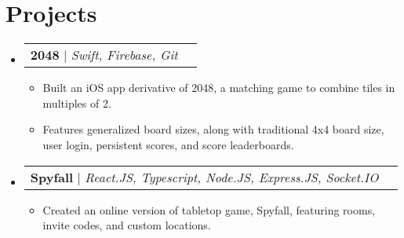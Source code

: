 \documentclass[letterpaper,11pt]{article}
\makeatletter
\newcommand{\resumeItem}[1]{
  \item\small{
    {#1 \vspace{-2pt}}
  }
}
\newcommand{\resumeProjectHeading}[2]{
    \item
    \begin{tabular*}{0.97\textwidth}{l@{\extracolsep{\fill}}r}
      \small#1 & #2 \\
    \end{tabular*}\vspace{-7pt}
}
\newcommand{\resumeSubHeadingListStart}{\begin{itemize}[leftmargin=0.15in, label={}]}
\newcommand{\resumeSubHeadingListEnd}{\end{itemize}}
\newcommand{\resumeItemListStart}{\begin{itemize}}
\newcommand{\resumeItemListEnd}{\end{itemize}\vspace{-5pt}}
\makeatother
\begin{document}
\section{Projects}
\resumeSubHeadingListStart
  \resumeProjectHeading
    {\textbf{2048} $|$ \emph{Swift, Firebase, Git}}{}
    \resumeItemListStart
      \resumeItem {Built an iOS app derivative of 2048, a matching game to combine tiles in multiples of 2.}
      \resumeItem {Features generalized board sizes, along with traditional 4x4 board size, user login, persistent scores, and score leaderboards.}
    \resumeItemListEnd
  \resumeProjectHeading
      {\textbf{Spyfall} $|$ \emph{React.JS, Typescript, Node.JS, Express.JS, Socket.IO}}{}
      \resumeItemListStart
        \resumeItem {Created an online version of tabletop game, Spyfall, featuring rooms, invite codes, and custom locations.}
      \resumeItemListEnd
\resumeSubHeadingListEnd

\end{document}
